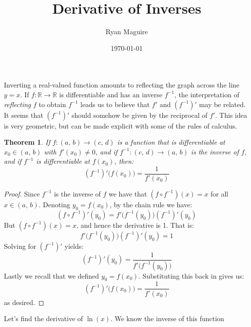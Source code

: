 \documentclass{article}
\title{Derivative of Inverses}
\author{Ryan Maguire}
\date{\today}
\theoremstyle{plain}
\newtheorem{theorem}{Theorem}
\begin{document}
    \maketitle
    Inverting a real-valued function amounts to reflecting the graph across
    the line $y=x$. If $f:\mathbb{R}\rightarrow\mathbb{R}$ is differentiable
    and has an inverse $f^{-1}$, the interpretation of \textit{reflecting} $f$
    to obtain $f^{-1}$ leads us to believe that $f'$ and $(f^{-1})'$ may be
    related. It seems that $(f^{-1})'$ should somehow be given by the
    reciprocal of $f'$. This idea is very geometric, but can be made explicit
    with some of the rules of calculus.
    \begin{theorem}
        If $f:(a,\,b)\rightarrow(c,\,d)$ is a function that is differentiable
        at $x_{0}\in(a,\,b)$ with $f'(x_{0})\ne{0}$,
        and if $f^{-1}:(c,\,d)\rightarrow(a,\,b)$ is the
        inverse of $f$, and if $f^{-1}$ is differentiable at $f(x_{0})$, then:
        \begin{equation}
            (f^{-1})'\big(f(x_{0})\big)=\frac{1}{f'(x_{0})}
        \end{equation}
    \end{theorem}
    \begin{proof}
        Since $f^{-1}$ is the inverse of $f$ we have that
        $(f\circ{f}^{-1})(x)=x$ for all $x\in(a,\,b)$. Denoting
        $y_{0}=f(x_{0})$, by the chain rule we have:
        \begin{equation}
            (f\circ{f}^{-1})'(y_{0})
            =f'\big(f^{-1}(y_{0})\big)(f^{-1})'(y_{0})
        \end{equation}
        But $(f\circ{f}^{-1})(x)=x$, and hence the derivative is 1. That is:
        \begin{equation}
            f'\big(f^{-1}(y_{0}))(f^{-1})'(y_{0})=1
        \end{equation}
        Solving for $(f^{-1})'$ yields:
        \begin{equation}
            (f^{-1})'(y_{0})=\frac{1}{f'\big(f^{-1}(y_{0})\big)}
        \end{equation}
        Lastly we recall that we defined $y_{0}=f(x_{0})$. Substituting this
        back in gives us:
        \begin{equation}
            (f^{-1})'\big(f(x_{0})\big)=\frac{1}{f'(x_{0})}
        \end{equation}
        as desired.
    \end{proof}
    Let's find the derivative of $\ln(x)$. We know the inverse of this function
\end{document}
